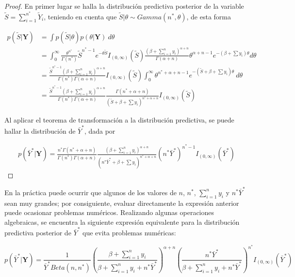 \documentclass[
  10pt,
  spanish,
]{book}
\theoremstyle{definition}
\theoremstyle{definition}
\theoremstyle{definition}
\theoremstyle{definition}
\theoremstyle{remark}
\begin{document}
\begin{proof}
{}En primer lugar se halla la distribución predictiva posterior de la variable \(\tilde{S}=\sum_{i=1}^{n^*}\tilde{Y}_i\), teniendo en cuenta que \(\tilde{S}|\theta\sim Gamma(n^*,\theta)\), de esta forma

\begin{align*}
p(\tilde{S}|\mathbf{Y})&=\int p(\tilde{S}|\theta)p(\theta|\mathbf{Y})\ d\theta\\
&=\int_0^{\infty} \frac{\theta^{n^*}}{\Gamma(n^*)}\tilde{S}^{n^*-1}e^{-\theta\tilde{S}}I_{(0,\infty)}(\tilde{S})\frac{(\beta+\sum_{i=1}^ny_i)^{\alpha+n}}{\Gamma(\alpha+n)}\theta^{{\alpha+n-1}}e^{-(\beta+\sum y_i)\theta}d\theta\\
&=\frac{\tilde{S}^{n^*-1}(\beta+\sum_{i=1}^ny_i)^{\alpha+n}}{\Gamma(n^*)\Gamma(\alpha+n)}I_{(0,\infty)}(\tilde{S})\int_0^{\infty} \theta^{n^*+\alpha+n-1}e^{-(\tilde{S}+\beta+\sum y_i)\theta}\ d\theta\\
&=\frac{\tilde{S}^{n^*-1}(\beta+\sum_{i=1}^ny_i)^{\alpha+n}}{\Gamma(n^*)\Gamma(\alpha+n)}\frac{\Gamma(n^*+\alpha+n)}{(\tilde{S}+\beta+\sum y_i)^{n^*+\alpha+n}}I_{(0,\infty)}(\tilde{S})
\end{align*}

Al aplicar el teorema de transformación a la distribución predictiva, se puede hallar la distribución de \(\bar{Y}^*\), dada por

\begin{align*}
p(\bar{Y}^*|\mathbf{Y})=\frac{n^*\Gamma(n^*+\alpha+n)}{\Gamma(n^*)\Gamma(\alpha+n)}\frac{(\beta+\sum_{i=1}^ny_i)^{\alpha+n}}{(n^*\bar{Y}^*+\beta+\sum y_i)^{n^*+\alpha+n}}(n^*\bar{Y}^*)^{n^*-1}I_{(0,\infty)}(\bar{Y}^*)
\end{align*}
\end{proof}

En la práctica puede ocurrir que algunos de los valores de \(n\), \(n^*\), \(\sum_{i=1}^ny_i\) y \(n^*\bar{Y}^*\) sean muy grandes; por consiguiente, evaluar directamente la expresión anterior puede ocasionar problemas numéricos. Realizando algunas operaciones algebraicas, se encuentra la siguiente expresión equivalente para la distribución predictiva posterior de \(\bar{Y}^*\) que evita problemas numéricas:

\begin{equation}
\label{eq:PredExpoInforma2}
p(\bar{Y}^*|\mathbf{Y})=\frac{1}{\bar{Y}^*Beta(n,n^*)}\left(\frac{\beta+\sum_{i=1}^ny_i}{\beta+\sum_{i=1}^ny_i+n^*\bar{Y}^*}\right)^{\alpha+n}\left(\frac{n^*\bar{Y}^*}{\beta+\sum_{i=1}^ny_i+n^*\bar{Y}^*}\right)^{n^*}I_{(0,\infty)}(\bar{Y}^*)
\end{equation}
\end{document}

